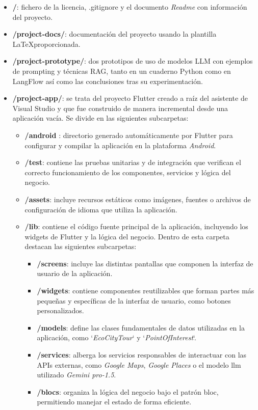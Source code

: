 \begin{itemize}
	
	\item \textbf{/}: fichero de la licencia, .gitignore y el documento \textit{Readme} con información del proyecto.
	
	\item \textbf{/project-docs/}: documentación del proyecto usando la plantilla \LaTeX  proporcionada.
	
	\item \textbf{/project-prototype/}: dos prototipos de uso de modelos LLM con ejemplos de prompting y técnicas RAG, tanto en un cuaderno Python como en LangFlow así como las conclusiones tras su experimentación.
	
	\item \textbf{/project-app/}: se trata del proyecto Flutter creado a raíz del asistente de Visual Studio y que fue construido de manera incremental desde una aplicación vacía. Se divide en las siguientes subcarpetas:
	\begin{itemize}
		\item \textbf{/android }: directorio generado automáticamente por Flutter para configurar y compilar la aplicación en la plataforma \textit{Android}.
		\item \textbf{/test}: contiene las pruebas unitarias y de integración que verifican el correcto funcionamiento de los componentes, servicios y lógica del negocio.
		\item \textbf{/assets}: incluye recursos estáticos como imágenes, fuentes o archivos de configuración de idioma que utiliza la aplicación.
		\item \textbf{/lib}: contiene el código fuente principal de la aplicación, incluyendo los widgets de Flutter y la lógica del negocio. Dentro de esta carpeta destacan las siguientes subcarpetas:
		\begin{itemize}
			\item \textbf{/screens}: incluye las distintas pantallas que componen la interfaz de usuario de la aplicación.
			\item \textbf{/widgets}: contiene componentes reutilizables que forman partes más pequeñas y específicas de la interfaz de usuario, como botones personalizados.
			\item \textbf{/models}: define las clases fundamentales de datos utilizadas en la aplicación, como `\textit{EcoCityTour}` y `\textit{PointOfInterest}`.
			\item \textbf{/services}: alberga los servicios responsables de interactuar con las APIs externas, como \textit{Google Maps}, \textit{Google Places} o el modelo \acrshort{llm} utilizado \textit{Gemini pro-1.5}.
			\item \textbf{/blocs}: organiza la lógica del negocio bajo el patrón \acrfull{bloc}, permitiendo manejar el estado de forma eficiente.
		\end{itemize}		
	\end{itemize}
\end{itemize}

